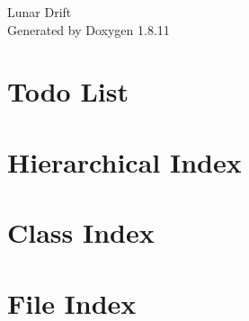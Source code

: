 \documentclass[twoside]{book}
\newcommand{\+}{\discretionary{\mbox{\scriptsize$\hookleftarrow$}}{}{}}
\newcommand{\clearemptydoublepage}{%
  \newpage{\pagestyle{empty}\cleardoublepage}%
}
\begin{document}
\hypersetup{pageanchor=false,
             bookmarksnumbered=true,
             pdfencoding=unicode
            }
\begin{titlepage}
\vspace*{7cm}
\begin{center}%
{\Large Lunar Drift }\\
\vspace*{1cm}
{\large Generated by Doxygen 1.8.11}\\
\end{center}
\end{titlepage}
\clearemptydoublepage
\tableofcontents
\clearemptydoublepage
{}
\hypersetup{pageanchor=true}

\chapter{Todo List}
\label{todo}
\hypertarget{todo}{}

\chapter{Hierarchical Index}

\chapter{Class Index}

\chapter{File Index}

\end{document}

